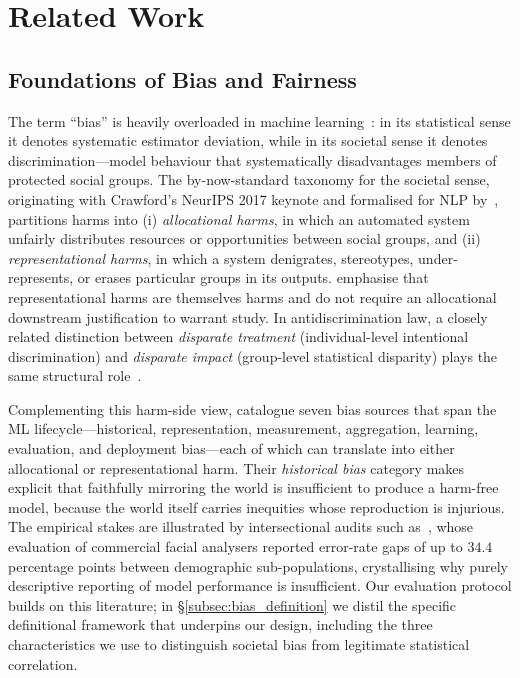 \documentclass[lettersize,journal]{IEEEtran}
\begin{document}
\section{Related Work}
\subsection{Foundations of Bias and Fairness}
\label{subsec:bias_foundations}
The term ``bias'' is heavily overloaded in machine learning~\cite{mehrabi2021survey}: in its statistical sense it denotes systematic estimator deviation, while in its societal sense it denotes discrimination---model behaviour that systematically disadvantages members of protected social groups. The by-now-standard taxonomy for the societal sense, originating with Crawford's NeurIPS 2017 keynote and formalised for NLP by~\cite{blodgett2020language}, partitions harms into (i) \emph{allocational harms}, in which an automated system unfairly distributes resources or opportunities between social groups, and (ii) \emph{representational harms}, in which a system denigrates, stereotypes, under-represents, or erases particular groups in its outputs. \cite{blodgett2020language} emphasise that representational harms are themselves harms and do not require an allocational downstream justification to warrant study. In antidiscrimination law, a closely related distinction between \emph{disparate treatment} (individual-level intentional discrimination) and \emph{disparate impact} (group-level statistical disparity) plays the same structural role~\cite{barocas2016big}.

Complementing this harm-side view, \cite{suresh2021framework} catalogue seven bias sources that span the ML lifecycle---historical, representation, measurement, aggregation, learning, evaluation, and deployment bias---each of which can translate into either allocational or representational harm. Their \emph{historical bias} category makes explicit that faithfully mirroring the world is insufficient to produce a harm-free model, because the world itself carries inequities whose reproduction is injurious. The empirical stakes are illustrated by intersectional audits such as~\cite{buolamwini2018gender}, whose evaluation of commercial facial analysers reported error-rate gaps of up to $34.4$ percentage points between demographic sub-populations, crystallising why purely descriptive reporting of model performance is insufficient. Our evaluation protocol builds on this literature; in \S\ref{subsec:bias_definition} we distil the specific definitional framework that underpins our design, including the three characteristics we use to distinguish societal bias from legitimate statistical correlation.
\end{document}
